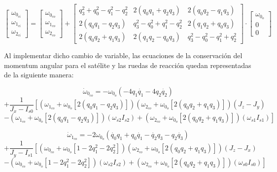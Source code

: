 \[
\begin{bmatrix}
	\omega_{0_{ci}} \\
	\omega_{1_{ci}} \\
	\omega_{2_{ci}}
\end{bmatrix}
=
\begin{bmatrix}
	\omega_{0_{co}} \\
	\omega_{1_{co}} \\
	\omega_{2_{co}}
\end{bmatrix}
+
\begin{bmatrix}
	q_3^2 + q_0^2 - q_1^2 - q_2^2 & 2(q_0 q_1 + q_2 q_3) & 2(q_0 q_2 - q_1 q_3) \\
	2(q_0 q_1 - q_2 q_3) & q_3^2 - q_0^2 + q_1^2 - q_2^2 & 2(q_1 q_2 + q_0 q_3) \\
	2(q_0 q_2 + q_1 q_3) & 2(q_1 q_2 - q_0 q_3) & q_3^2 - q_0^2 - q_1^2 + q_2^2
\end{bmatrix}
\cdot
\begin{bmatrix}
	\omega_{0_o} \\
	0 \\
	0
\end{bmatrix}
\]

Al implementar dicho cambio de variable, las ecuaciones de la conservación del momentum angular para el satélite y las ruedas de reacción quedan representadas de la siguiente manera:

\[
\dot{\omega}_{0_{co}} = -\omega_{0_{o}} \left( -4 q_1 \dot{q_1} - 4 q_2 \dot{q_2} \right) 
\]
\[
+ \frac{1}{J_x - I_{s0}} \left[ \left( \omega_{1_{co}} + \omega_{0_{o}} \left[ 2(q_0 q_1 - q_2 q_3) \right] \right) 
\left( \omega_{2_{co}} + \omega_{0_{o}} \left[ 2(q_0 q_2 + q_1 q_3) \right] \right) (J_z - J_y) \right.
\]
\[
\left. - \left( \omega_{1_{co}} + \omega_{0_{o}} \left[ 2(q_0 q_1 - q_2 q_3) \right] \right) (\omega_{s2} I_{s2}) 
+ \left( \omega_{2_{co}} + \omega_{0_{o}} \left[ 2(q_0 q_2 + q_1 q_3) \right] \right) (\omega_{s1} I_{s1}) \right]
\]


\[
\dot{\omega}_{1_{co}} = -2\omega_{0_{o}} \left(\dot{q_0} q_1 +  q_0 \dot{q_1} - \dot{q_2} q_3 -  q_2 \dot{q_3} \right) 
\]
\[
+ \frac{1}{J_y - I_{s1}} \left[ \left( \omega_{0_{co}} + \omega_{0_{o}} \left[1-2q_1^2-2q_2^2 \right] \right) 
\left( \omega_{2_{co}} + \omega_{0_{o}} \left[ 2(q_0 q_2 + q_1 q_3) \right] \right) (J_z - J_x) \right.
\]
\[
\left. - \left( \omega_{0_{co}} + \omega_{0_{o}} \left[ 1-2q_1^2-2q_2^2 \right] \right) (\omega_{s2} I_{s2}) + \left( \omega_{2_{co}} + \omega_{0_{o}} \left[ 2(q_0 q_2 + q_1 q_3) \right] \right) (\omega_{s0} I_{s0}) \right]
\]


